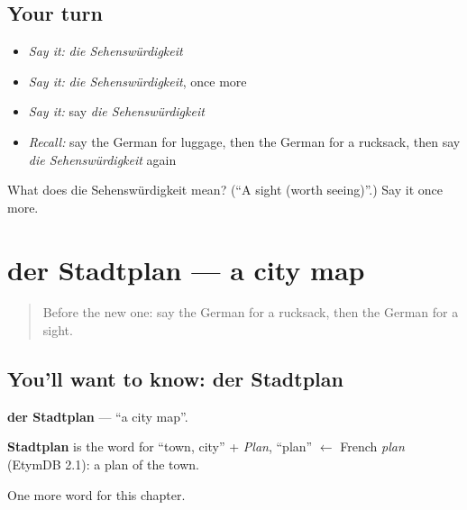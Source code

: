 \subsection*{Your turn}
\begin{itemize}
\raggedright
  \item \emph{Say it:} \emph{die Sehenswürdigkeit}
  \item \emph{Say it:} \emph{die Sehenswürdigkeit}, once more
  \item \emph{Say it:} say \emph{die Sehenswürdigkeit}
  \item \emph{Recall:} say the German for luggage, then the German for a rucksack, then say \emph{die Sehenswürdigkeit} again
\end{itemize}

\begin{tcolorbox}[breakable,colback=teal!4,colframe=teal!35!black,title={Before you move on}]
What does die Sehenswürdigkeit mean? (\textquotedblleft{}A sight (worth seeing)\textquotedblright{}.) Say it once more.
\end{tcolorbox}
\section[der Stadtplan]{der Stadtplan — a city map}

\label{lesson:GE-C194-stadtplan}



\begin{quote}
Before the new one: say the German for a rucksack, then the German for a sight.
\end{quote}

\subsection*{You'll want to know: der Stadtplan}
\textbf{der Stadtplan} — \textquotedblleft{}a city map\textquotedblright{}.

\begin{cousinweb}
\textbf{Stadtplan} is the word for \textquotedblleft{}town, city\textquotedblright{} + \emph{Plan}, \textquotedblleft{}plan\textquotedblright{} $\leftarrow$ French \emph{plan} (EtymDB 2.1): a plan of the town.
\end{cousinweb}

\begin{grammarlens}[title={What you've built}]
One more word for this chapter.
\end{grammarlens}


